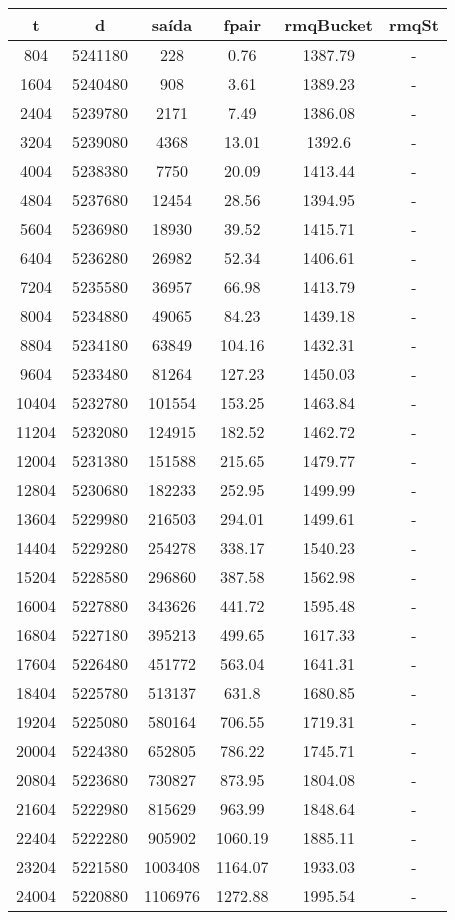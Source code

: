 \begin{tabular}{|c|c|c|c|c|c|}
\hline
\textbf{t} & \textbf{d} & \textbf{saída} & \textbf{fpair} & \textbf{rmqBucket} & \textbf{rmqSt}\\
\hline
804 & 5241180 & 228 & 0.76 & 1387.79 & -\\
\hline
1604 & 5240480 & 908 & 3.61 & 1389.23 & -\\
\hline
2404 & 5239780 & 2171 & 7.49 & 1386.08 & -\\
\hline
3204 & 5239080 & 4368 & 13.01 & 1392.6 & -\\
\hline
4004 & 5238380 & 7750 & 20.09 & 1413.44 & -\\
\hline
4804 & 5237680 & 12454 & 28.56 & 1394.95 & -\\
\hline
5604 & 5236980 & 18930 & 39.52 & 1415.71 & -\\
\hline
6404 & 5236280 & 26982 & 52.34 & 1406.61 & -\\
\hline
7204 & 5235580 & 36957 & 66.98 & 1413.79 & -\\
\hline
8004 & 5234880 & 49065 & 84.23 & 1439.18 & -\\
\hline
8804 & 5234180 & 63849 & 104.16 & 1432.31 & -\\
\hline
9604 & 5233480 & 81264 & 127.23 & 1450.03 & -\\
\hline
10404 & 5232780 & 101554 & 153.25 & 1463.84 & -\\
\hline
11204 & 5232080 & 124915 & 182.52 & 1462.72 & -\\
\hline
12004 & 5231380 & 151588 & 215.65 & 1479.77 & -\\
\hline
12804 & 5230680 & 182233 & 252.95 & 1499.99 & -\\
\hline
13604 & 5229980 & 216503 & 294.01 & 1499.61 & -\\
\hline
14404 & 5229280 & 254278 & 338.17 & 1540.23 & -\\
\hline
15204 & 5228580 & 296860 & 387.58 & 1562.98 & -\\
\hline
16004 & 5227880 & 343626 & 441.72 & 1595.48 & -\\
\hline
16804 & 5227180 & 395213 & 499.65 & 1617.33 & -\\
\hline
17604 & 5226480 & 451772 & 563.04 & 1641.31 & -\\
\hline
18404 & 5225780 & 513137 & 631.8 & 1680.85 & -\\
\hline
19204 & 5225080 & 580164 & 706.55 & 1719.31 & -\\
\hline
20004 & 5224380 & 652805 & 786.22 & 1745.71 & -\\
\hline
20804 & 5223680 & 730827 & 873.95 & 1804.08 & -\\
\hline
21604 & 5222980 & 815629 & 963.99 & 1848.64 & -\\
\hline
22404 & 5222280 & 905902 & 1060.19 & 1885.11 & -\\
\hline
23204 & 5221580 & 1003408 & 1164.07 & 1933.03 & -\\
\hline
24004 & 5220880 & 1106976 & 1272.88 & 1995.54 & -\\
\hline
\end{tabular}
